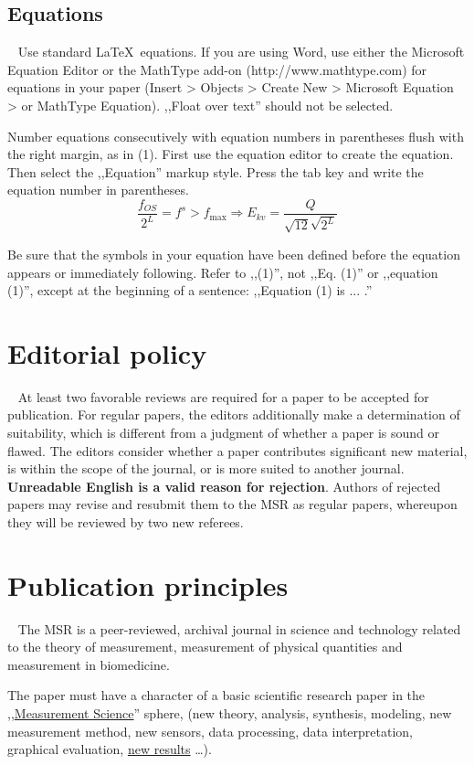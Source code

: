 \documentclass[english]{MSRarticle}
\begin{document}
\subsection{Equations}
\
\indent
Use standard \LaTeX\  equations. If you are using Word, use either the Microsoft Equation Editor or the MathType add-on (http://www.mathtype.com) for equations in your paper (Insert > Objects > Create New > Microsoft Equation > or MathType Equation). ,,Float over text'' should not be selected.

Number equations consecutively with equation numbers in parentheses flush with the right margin, as in (1). First use the equation editor to create the equation. Then select the ,,Equation'' markup style. Press the tab key and write the equation number in parentheses.
\begin{equation}
	\frac{f_{OS}}{2^L} = f^s > f_{\max} \Rightarrow E_{kv} = \frac{Q}{\sqrt{12}\sqrt{2^L}}
\end{equation}

Be sure that the symbols in your equation have been defined before the equation appears or immediately following. Refer to ,,(1)'', not ,,Eq. (1)'' or ,,equation (1)'', except at the beginning of a sentence: ,,Equation (1) is ... .''


\section{Editorial policy}
\
\indent
At least two favorable reviews are required for a paper to be accepted for publication. For regular papers, the editors additionally make a determination of suitability, which is different from a judgment of whether a paper is sound or flawed. The editors consider whether a paper contributes significant new material, is within the scope of the journal, or is more suited to another journal. \textbf{Unreadable English is a valid reason for rejection}. Authors of rejected papers may revise and resubmit them to the MSR as regular papers, whereupon they will be reviewed by two new referees.

\section{Publication principles}
\
\indent
The MSR is a peer-reviewed, archival journal in science and technology related to the theory of measurement, measurement of physical quantities and measurement in biomedicine.

The paper must have a character of a basic scientific research paper in the ,,\underline{Measurement Science}'' sphere, (new theory, analysis, synthesis, modeling, new measurement method, new sensors, data processing, data interpretation, graphical evaluation, \underline{new results} \dots).
\end{document}
